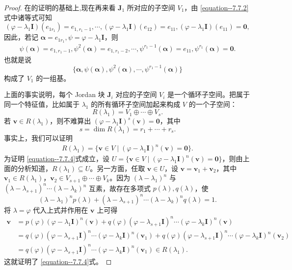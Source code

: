 \documentclass[../../main.tex]{subfiles}
\begin{document}
\begin{proof}
在的证明的基础上,现在再来看 $\boldsymbol{J}_1$ 所对应的子空间 $V_1$，由 \eqref{equation--7.7.2}式中诸等式可知
\[
(\varphi - \lambda_1\boldsymbol{I})(e_{1r_1}) = e_{1,r_1 - 1}, \cdots, (\varphi - \lambda_1\boldsymbol{I})(e_{12}) = e_{11}, (\varphi - \lambda_1\boldsymbol{I})(e_{11}) = \boldsymbol{0},
\]
因此，若记 $\boldsymbol{\alpha} = e_{1r_1}, \psi = \varphi - \lambda_1\boldsymbol{I}$，则
\begin{align*}
\psi(\boldsymbol{\alpha}) = e_{1,r_1 - 1},  \psi^2(\boldsymbol{\alpha}) = e_{1,r_1 - 2},  \cdots,  \psi^{r_1 - 1}(\boldsymbol{\alpha}) = e_{11},  \psi^{r_1}(\boldsymbol{\alpha}) = \boldsymbol{0}.
\end{align*}
也就是说
\[
\{\boldsymbol{\alpha}, \psi(\boldsymbol{\alpha}), \psi^2(\boldsymbol{\alpha}), \cdots, \psi^{r_1 - 1}(\boldsymbol{\alpha})\}
\]
构成了 $V_1$ 的一组基。

上面的事实说明，每个 Jordan 块 $\boldsymbol{J}_i$ 对应的子空间 $V_i$ 是一个循环子空间。把属于同一个特征值，比如属于 $\lambda_1$ 的所有循环子空间加起来构成 $V$ 的一个子空间：
\[
R(\lambda_1) = V_1 \oplus \cdots \oplus V_s.
\]
若 $\boldsymbol{v} \in R(\lambda_1)$，则不难算出 $(\varphi - \lambda_1\boldsymbol{I})^s(\boldsymbol{v}) = \boldsymbol{0}$，其中
\[
s = \dim R(\lambda_1) = r_1 + \cdots + r_s.
\]
事实上，我们可以证明
\begin{align}\label{equation--7.7.4}
R(\lambda_1) = \{\boldsymbol{v} \in V \mid (\varphi - \lambda_1\boldsymbol{I})^n(\boldsymbol{v}) = \boldsymbol{0}\}.
\end{align}
为证明 \eqref{equation--7.7.4}式成立，设 $U = \{\boldsymbol{v} \in V \mid (\varphi - \lambda_1\boldsymbol{I})^n(\boldsymbol{v}) = \boldsymbol{0}\}$，则由上面的分析知道，$R(\lambda_1) \subseteq U$。另一方面，任取 $\boldsymbol{v} \in U$，设 $\boldsymbol{v} = \boldsymbol{v}_1 + \boldsymbol{v}_2$，其中 $\boldsymbol{v}_1 \in R(\lambda_1)$，$\boldsymbol{v}_2 \in V_{s + 1} \oplus \cdots \oplus V_k$。因为 $(\lambda - \lambda_1)^n$ 与 $(\lambda - \lambda_{s + 1})^n \cdots (\lambda - \lambda_k)^n$ 互素，故存在多项式 $p(\lambda), q(\lambda)$，使
\[
(\lambda - \lambda_1)^n p(\lambda) + (\lambda - \lambda_{s + 1})^n \cdots (\lambda - \lambda_k)^n q(\lambda) = 1.
\]
将 $\lambda = \varphi$ 代入上式并作用在 $\boldsymbol{v}$ 上可得
\begin{align*}
\boldsymbol{v} &= p(\varphi)(\varphi - \lambda_1\boldsymbol{I})^n(\boldsymbol{v}) + q(\varphi)(\varphi - \lambda_{s + 1}\boldsymbol{I})^n \cdots (\varphi - \lambda_k\boldsymbol{I})^n(\boldsymbol{v}) \\
&= q(\varphi)(\varphi - \lambda_{s + 1}\boldsymbol{I})^n \cdots (\varphi - \lambda_k\boldsymbol{I})^n(\boldsymbol{v}_1) + q(\varphi)(\varphi - \lambda_{s + 1}\boldsymbol{I})^n \cdots (\varphi - \lambda_k\boldsymbol{I})^n(\boldsymbol{v}_2) \\
&= q(\varphi)(\varphi - \lambda_{s + 1}\boldsymbol{I})^n \cdots (\varphi - \lambda_k\boldsymbol{I})^n(\boldsymbol{v}_1) \in R(\lambda_1).
\end{align*}
这就证明了 \eqref{equation--7.7.4}式。


\end{proof}
\end{document}

